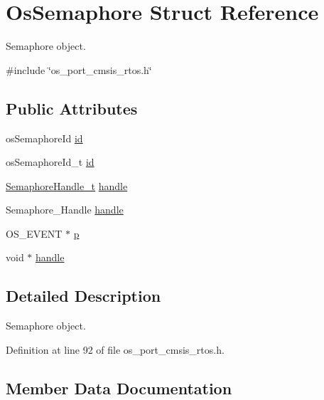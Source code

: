 \hypertarget{structOsSemaphore}{}\section{Os\+Semaphore Struct Reference}
\label{structOsSemaphore}


Semaphore object.  




{\ttfamily \#include \char`\"{}os\+\_\+port\+\_\+cmsis\+\_\+rtos.\+h\char`\"{}}

\subsection*{Public Attributes}
\begin{DoxyCompactItemize}
\item 
os\+Semaphore\+Id \hyperlink{structOsSemaphore_a524627618a2b124f35e450b4ba708098}{id}
\item 
os\+Semaphore\+Id\+\_\+t \hyperlink{structOsSemaphore_a5fe036ca34ddf8add030ac20995157af}{id}
\item 
\hyperlink{semphr_8h_ad88c6df4a04beedeac782918c8a332f5}{Semaphore\+Handle\+\_\+t} \hyperlink{structOsSemaphore_ae3a5702fa22ee14f97091aab20d8ecaf}{handle}
\item 
Semaphore\+\_\+\+Handle \hyperlink{structOsSemaphore_ab28922c09a3089d95d8cb7f617177ff5}{handle}
\item 
O\+S\+\_\+\+E\+V\+E\+NT $\ast$ \hyperlink{structOsSemaphore_acbca71c74ddf512be48f0e9214b5391e}{p}
\item 
void $\ast$ \hyperlink{structOsSemaphore_a25e7809a47193f8d2c5aac378a8f3d08}{handle}
\end{DoxyCompactItemize}


\subsection{Detailed Description}
Semaphore object. 

Definition at line 92 of file os\+\_\+port\+\_\+cmsis\+\_\+rtos.\+h.



\subsection{Member Data Documentation}
\mbox{\label{structOsSemaphore_a25e7809a47193f8d2c5aac378a8f3d08}} 
